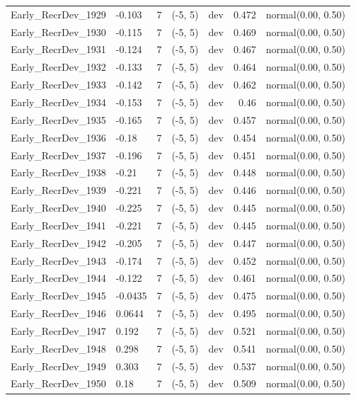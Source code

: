 \documentclass[
]{scrartcl}
\begin{document}
\begin{landscape}
\begin{longtable}{llrllrl}
Early\_RecrDev\_1929 & -0.103 & 7 & (-5, 5) & dev & 0.472 & normal(0.00, 0.50) \\ 
Early\_RecrDev\_1930 & -0.115 & 7 & (-5, 5) & dev & 0.469 & normal(0.00, 0.50) \\ 
Early\_RecrDev\_1931 & -0.124 & 7 & (-5, 5) & dev & 0.467 & normal(0.00, 0.50) \\ 
Early\_RecrDev\_1932 & -0.133 & 7 & (-5, 5) & dev & 0.464 & normal(0.00, 0.50) \\ 
Early\_RecrDev\_1933 & -0.142 & 7 & (-5, 5) & dev & 0.462 & normal(0.00, 0.50) \\ 
Early\_RecrDev\_1934 & -0.153 & 7 & (-5, 5) & dev & 0.46 & normal(0.00, 0.50) \\ 
Early\_RecrDev\_1935 & -0.165 & 7 & (-5, 5) & dev & 0.457 & normal(0.00, 0.50) \\ 
Early\_RecrDev\_1936 & -0.18 & 7 & (-5, 5) & dev & 0.454 & normal(0.00, 0.50) \\ 
Early\_RecrDev\_1937 & -0.196 & 7 & (-5, 5) & dev & 0.451 & normal(0.00, 0.50) \\ 
Early\_RecrDev\_1938 & -0.21 & 7 & (-5, 5) & dev & 0.448 & normal(0.00, 0.50) \\ 
Early\_RecrDev\_1939 & -0.221 & 7 & (-5, 5) & dev & 0.446 & normal(0.00, 0.50) \\ 
Early\_RecrDev\_1940 & -0.225 & 7 & (-5, 5) & dev & 0.445 & normal(0.00, 0.50) \\ 
Early\_RecrDev\_1941 & -0.221 & 7 & (-5, 5) & dev & 0.445 & normal(0.00, 0.50) \\ 
Early\_RecrDev\_1942 & -0.205 & 7 & (-5, 5) & dev & 0.447 & normal(0.00, 0.50) \\ 
Early\_RecrDev\_1943 & -0.174 & 7 & (-5, 5) & dev & 0.452 & normal(0.00, 0.50) \\ 
Early\_RecrDev\_1944 & -0.122 & 7 & (-5, 5) & dev & 0.461 & normal(0.00, 0.50) \\ 
Early\_RecrDev\_1945 & -0.0435 & 7 & (-5, 5) & dev & 0.475 & normal(0.00, 0.50) \\ 
Early\_RecrDev\_1946 & 0.0644 & 7 & (-5, 5) & dev & 0.495 & normal(0.00, 0.50) \\ 
Early\_RecrDev\_1947 & 0.192 & 7 & (-5, 5) & dev & 0.521 & normal(0.00, 0.50) \\ 
Early\_RecrDev\_1948 & 0.298 & 7 & (-5, 5) & dev & 0.541 & normal(0.00, 0.50) \\ 
Early\_RecrDev\_1949 & 0.303 & 7 & (-5, 5) & dev & 0.537 & normal(0.00, 0.50) \\ 
Early\_RecrDev\_1950 & 0.18 & 7 & (-5, 5) & dev & 0.509 & normal(0.00, 0.50) \\ 

\end{longtable}
\end{landscape}
\end{document}
